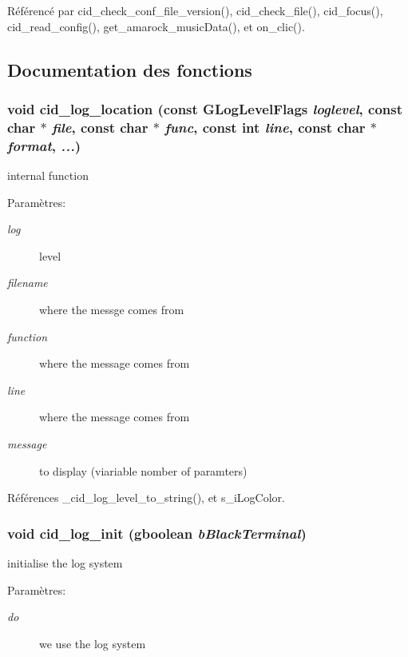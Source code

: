 Référencé par cid\_\-check\_\-conf\_\-file\_\-version(), cid\_\-check\_\-file(), cid\_\-focus(), cid\_\-read\_\-config(), get\_\-amarock\_\-musicData(), et on\_\-clic().

\subsection{Documentation des fonctions}
\subsubsection{\setlength{\rightskip}{0pt plus 5cm}void cid\_\-log\_\-location (const GLogLevelFlags {\em loglevel}, \/  const char $\ast$ {\em file}, \/  const char $\ast$ {\em func}, \/  const int {\em line}, \/  const char $\ast$ {\em format}, \/   {\em ...})}\label{cid-messages_8h_bd4aa69876ed51a037deb593eb7219cb}


internal function \begin{Desc}
\item[Paramètres:]
\begin{description}
\item[{\em log}]level \item[{\em filename}]where the messge comes from \item[{\em function}]where the message comes from \item[{\em line}]where the message comes from \item[{\em message}]to display (viariable nomber of paramters) \end{description}
\end{Desc}


Références \_\-cid\_\-log\_\-level\_\-to\_\-string(), et s\_\-iLogColor.
\subsubsection{\setlength{\rightskip}{0pt plus 5cm}void cid\_\-log\_\-init (gboolean {\em bBlackTerminal})}\label{cid-messages_8h_6aed9a1a5cbf05c3cb5ff4a34e3e3c14}


initialise the log system \begin{Desc}
\item[Paramètres:]
\begin{description}
\item[{\em do}]we use the log system \end{description}
\end{Desc}


